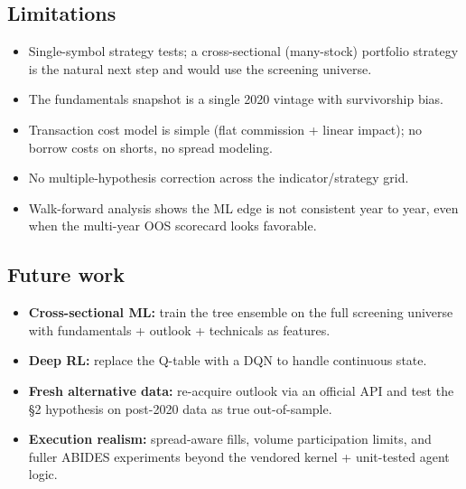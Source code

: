 \documentclass[
  11pt,
]{article}
\providecommand{\tightlist}{%
  \setlength{\itemsep}{0pt}\setlength{\parskip}{0pt}}
\begin{document}
\subsection{Limitations}\label{limitations}

\begin{itemize}
\tightlist
\item
  Single-symbol strategy tests; a cross-sectional (many-stock) portfolio
  strategy is the natural next step and would use the screening
  universe.\\
\item
  The fundamentals snapshot is a single 2020 vintage with survivorship
  bias.\\
\item
  Transaction cost model is simple (flat commission + linear impact); no
  borrow costs on shorts, no spread modeling.\\
\item
  No multiple-hypothesis correction across the indicator/strategy
  grid.\\
\item
  Walk-forward analysis shows the ML edge is not consistent year to
  year, even when the multi-year OOS scorecard looks favorable.
\end{itemize}

\subsection{Future work}\label{future-work}

\begin{itemize}
\tightlist
\item
  \textbf{Cross-sectional ML:} train the tree ensemble on the full
  screening universe with fundamentals + outlook + technicals as
  features.\\
\item
  \textbf{Deep RL:} replace the Q-table with a DQN to handle continuous
  state.\\
\item
  \textbf{Fresh alternative data:} re-acquire outlook via an official
  API and test the §2 hypothesis on post-2020 data as true
  out-of-sample.\\
\item
  \textbf{Execution realism:} spread-aware fills, volume participation
  limits, and fuller ABIDES experiments beyond the vendored kernel +
  unit-tested agent logic.
\end{itemize}
\end{document}
